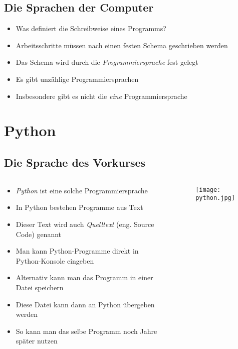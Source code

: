 \subsection{Die Sprachen der Computer}
\begin{frame}
	\slidehead
	\begin{itemize}[<+->]
		\item Was definiert die Schreibweise eines Programms?
		\item Arbeitsschritte müssen nach einen festen Schema geschrieben werden
		\item Das Schema wird durch die \emph{Programmiersprache} fest gelegt
		\item Es gibt unzählige Programmiersprachen
		\item Insbesondere gibt es nicht die \emph{eine} Programmiersprache
	\end{itemize}
\end{frame}

\section{Python}
\subsection{Die Sprache des Vorkurses}
\begin{frame}
	\slidehead
	\begin{columns}
		\begin{column}{ 0.7\textwidth }
			\begin{itemize}[<+->]
				\item \emph{Python} ist eine solche Programmiersprache
				\item In Python bestehen Programme aus Text
				\item Dieser Text wird auch \emph{Quelltext} (eng. Source Code) genannt
				\item Man kann Python-Programme direkt in Python-Konsole eingeben
				\item Alternativ kann man das Programm in einer Datei speichern
				\item Diese Datei kann dann an Python übergeben werden
				\item So kann man das selbe Programm noch Jahre später nutzen
			\end{itemize}
		\end{column}%
		\begin{column}{ 0.3\textwidth }
			\begin{figure}
				\texttt{[image: python.jpg]}
			\end{figure}
		\end{column}
	\end{columns}
\end{frame}

